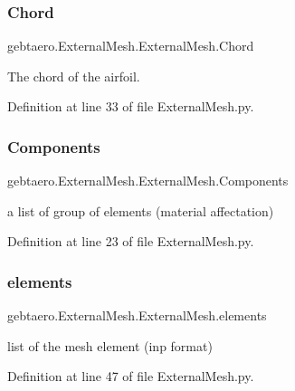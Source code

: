 \subsubsection{\texorpdfstring{Chord}{Chord}}
{\footnotesize\ttfamily gebtaero.\+External\+Mesh.\+External\+Mesh.\+Chord}



The chord of the airfoil. 



Definition at line 33 of file External\+Mesh.\+py.

\mbox{\label{classgebtaero_1_1_external_mesh_1_1_external_mesh_a592c0deea81b1ba0e686add0943889b4}} 
\subsubsection{\texorpdfstring{Components}{Components}}
{\footnotesize\ttfamily gebtaero.\+External\+Mesh.\+External\+Mesh.\+Components}



a list of group of elements (material affectation) 



Definition at line 23 of file External\+Mesh.\+py.

\mbox{\label{classgebtaero_1_1_external_mesh_1_1_external_mesh_a1a044fbcf39f5f8e7d3e3b98d291010d}} 
\subsubsection{\texorpdfstring{elements}{elements}}
{\footnotesize\ttfamily gebtaero.\+External\+Mesh.\+External\+Mesh.\+elements}



list of the mesh element (inp format) 



Definition at line 47 of file External\+Mesh.\+py.

